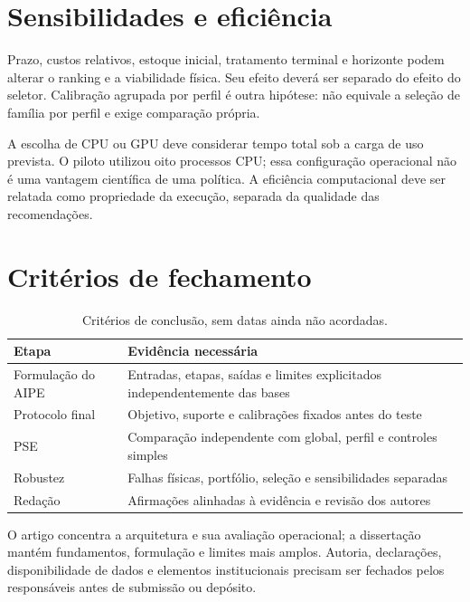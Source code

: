 \section{Sensibilidades e eficiência}
\label{sec:robustez_pooling}
Prazo, custos relativos, estoque inicial, tratamento terminal e horizonte podem alterar o ranking e a viabilidade física. Seu efeito deverá ser separado do efeito do seletor. Calibração agrupada por perfil é outra hipótese: não equivale a seleção de família por perfil e exige comparação própria.

A escolha de CPU ou GPU deve considerar tempo total sob a carga de uso prevista. O piloto utilizou oito processos CPU; essa configuração operacional não é uma vantagem científica de uma política. A eficiência computacional deve ser relatada como propriedade da execução, separada da qualidade das recomendações.

\section{Critérios de fechamento}
\begin{table}[htbp]\centering\small
\caption{Critérios de conclusão, sem datas ainda não acordadas.}\label{tab:cronograma}
\begin{tabular}{@{}p{4cm}p{8.8cm}@{}}\toprule
Etapa & Evidência necessária\\\midrule
Formulação do AIPE & Entradas, etapas, saídas e limites explicitados independentemente das bases\\
Protocolo final & Objetivo, suporte e calibrações fixados antes do teste\\
PSE & Comparação independente com global, perfil e controles simples\\
Robustez & Falhas físicas, portfólio, seleção e sensibilidades separadas\\
Redação & Afirmações alinhadas à evidência e revisão dos autores\\\bottomrule
\end{tabular}\end{table}

O artigo concentra a arquitetura e sua avaliação operacional; a dissertação mantém fundamentos, formulação e limites mais amplos. Autoria, declarações, disponibilidade de dados e elementos institucionais precisam ser fechados pelos responsáveis antes de submissão ou depósito.
